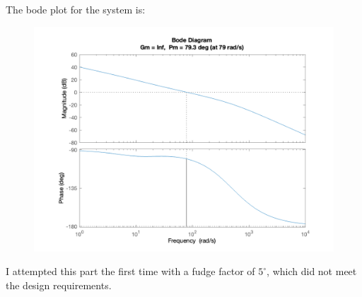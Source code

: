 \documentclass[12pt, letterpaper]{../assignment}
\begin{document}
The bode plot for the system is:

\begin{figure}[H]
    \centering
    \includegraphics[width=0.85\linewidth]{./figures/margin_plot.png}
\end{figure}

I attempted this part the first time with a fudge factor of $5^\circ$,
which did not meet the design requirements.


\end{document}
